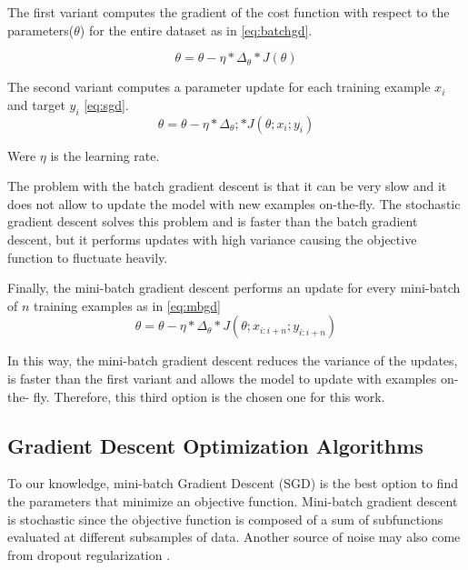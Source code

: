 The first variant computes the gradient of the cost function with respect to the parameters($\theta$) for the entire dataset as in \ref{eq:batchgd}.

\begin{equation} \label{eq:batchgd}
\theta=\theta-\eta * \Delta_\theta * J(\theta)
\end{equation}

The second variant computes a parameter update for each training example $x_i$ and target $y_i$ \ref{eq:sgd}.
\begin{equation} \label{eq:sgd}
\theta=\theta-\eta * \Delta_\theta; * J(\theta;x_i;y_i)
\end{equation}

Were $\eta$ is the learning rate.

The problem with the batch gradient descent is that it can be very slow and it does not allow to update the model with new examples on-the-fly. The stochastic gradient descent solves this problem and is faster than the batch gradient descent, but it performs updates with high variance causing the objective function to fluctuate heavily.  

Finally, the mini-batch gradient descent performs an update for every mini-batch of $n$ training examples as in \ref{eq:mbgd} \begin{equation} \label{eq:mbgd}
\theta=\theta-\eta * \Delta_\theta * J(\theta;x_{i:i+n};y_{i:i+n})
\end{equation}

In this way, the mini-batch gradient descent reduces the variance of the updates, is faster than the first variant and allows the model to update with examples on-the- fly. Therefore, this third option is the chosen one for this work\cite{ruder2016overview}. 


\subsection{Gradient Descent Optimization Algorithms}
To our knowledge, mini-batch Gradient Descent (SGD) is the best option to find the parameters that minimize an objective function. Mini-batch gradient descent is stochastic since the objective function is composed of a sum of subfunctions evaluated at different subsamples of data. Another source of noise may also come from dropout regularization \cite{kingma2014adam}. 

